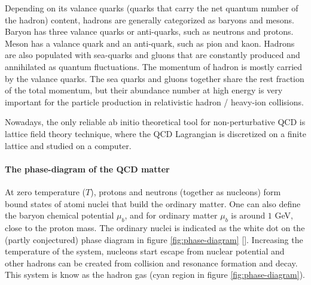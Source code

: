 Depending on its valance quarks (quarks that carry the net quantum number of the hadron) content, hadrons are generally categorized as baryons and mesons.
Baryon has three valance quarks or anti-quarks, such as neutrons and protons.
Meson has a valance quark and an anti-quark, such as pion and kaon.
Hadrons are also populated with sea-quarks and gluons that are constantly produced and annihilated as quantum fluctuations.
The momentum of hadron is mostly carried by the valance quarks.
The sea quarks and gluons together share the rest fraction of the total momentum, but their abundance number at high energy is very important for the particle production in relativistic hadron / heavy-ion collisions.

Nowadays, the only reliable ab initio theoretical tool for non-perturbative QCD is lattice field theory technique, where the QCD Lagrangian is discretized on a finite lattice and studied on a computer.

\paragraph{The phase-diagram of the QCD matter}
At zero temperature ($T$), protons and neutrons (together as nucleons) form bound states of atomi nuclei that build the ordinary matter.
One can also define the baryon chemical potential $\mu_b$, and for ordinary matter $\mu_b$ is around $1$ GeV, close to the proton mass.
The ordinary nuclei is indicated as the white dot on the (partly conjectured) phase diagram in figure \ref{fig:phase-diagram} [].
Increasing the temperature of the system, nucleons start escape from nuclear potential and other hadrons can be created from collision and resonance formation and decay.
This system is know as the hadron gas (cyan region in figure \ref{fig:phase-diagram}).

